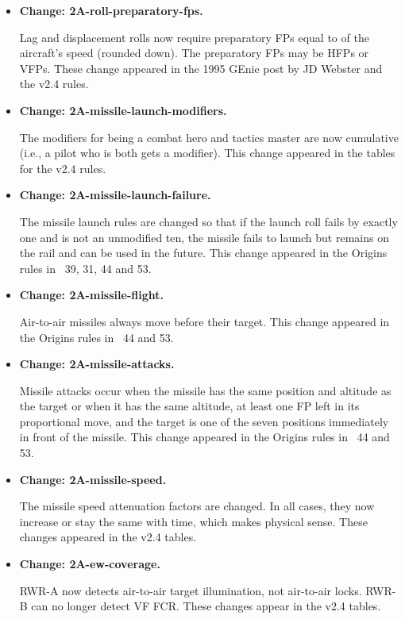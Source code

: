 \documentclass{report}
\newcommand{\changetag}[1]{\textbf{Change: #1.}\par}
\begin{document}
\begin{itemize}
    \item\changetag{2A-roll-preparatory-fps}

        Lag and displacement rolls now require preparatory FPs equal to {\onethird} of the aircraft's speed (rounded down). The preparatory FPs may be HFPs or VFPs. These change appeared in the 1995 GEnie post by JD Webster and the v2.4 rules.

    \item\changetag{2A-missile-launch-modifiers}

        The modifiers for being a combat hero and tactics master are now cumulative (i.e., a pilot who is both gets a  modifier). This change appeared in the tables for the v2.4 rules.

    \item\changetag{2A-missile-launch-failure}

        The missile launch rules are changed so that if the launch roll fails by exactly one and is not an unmodified ten, the missile fails to launch but remains on the rail and can be used in the future. This change appeared in the Origins rules in \APJ~39, 31, 44 and 53.

    \item\changetag{2A-missile-flight}

        Air-to-air missiles always move before their target. This change appeared in the Origins rules in \APJ~44 and 53.

    \item\changetag{2A-missile-attacks}

        Missile attacks occur when the missile has the same position and altitude as the target or when it has the same altitude, at least one FP left in its proportional move, and the target is one of the seven positions immediately in front of the missile. This change appeared in the Origins rules in \APJ~44 and 53.

    \item\changetag{2A-missile-speed}

        The missile speed attenuation factors are changed. In all cases, they now increase or stay the same with time, which makes physical sense. These changes appeared in the v2.4 tables.

    \item\changetag{2A-ew-coverage}

        RWR-A now detects air-to-air target illumination, not air-to-air locks. RWR-B can no longer detect VF FCR. These changes appear in the v2.4 tables.


\end{itemize}
\end{document}
